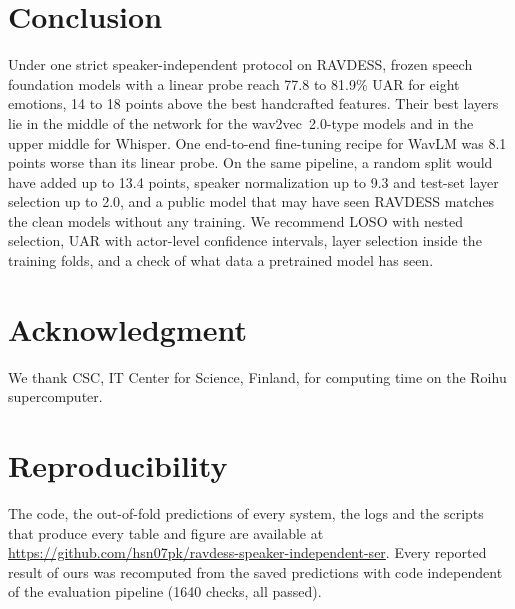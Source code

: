 \documentclass[journal]{IEEEtran}
\begin{document}
\section{Conclusion}
Under one strict speaker-independent protocol on RAVDESS, frozen speech foundation models with a linear probe reach 77.8 to 81.9\% UAR for eight emotions, 14 to 18 points above the best handcrafted features. Their best layers lie in the middle of the network for the wav2vec~2.0-type models and in the upper middle for Whisper. One end-to-end fine-tuning recipe for WavLM was 8.1 points worse than its linear probe. On the same pipeline, a random split would have added up to 13.4 points, speaker normalization up to 9.3 and test-set layer selection up to 2.0, and a public model that may have seen RAVDESS matches the clean models without any training. We recommend LOSO with nested selection, UAR with actor-level confidence intervals, layer selection inside the training folds, and a check of what data a pretrained model has seen.

\section*{Acknowledgment}
We thank CSC, IT Center for Science, Finland, for computing time on the Roihu supercomputer.

\section*{Reproducibility}
The code, the out-of-fold predictions of every system, the logs and the scripts that produce every table and figure are available at \url{https://github.com/hsn07pk/ravdess-speaker-independent-ser}. Every reported result of ours was recomputed from the saved predictions with code independent of the evaluation pipeline (1640 checks, all passed).



\end{document}
